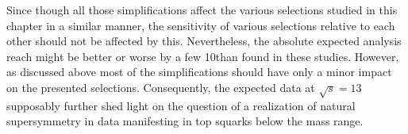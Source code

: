 Since though all those simplifications affect the various selections studied in this chapter in a similar manner, the sensitivity of various selections relative to each other should not be affected by this. Nevertheless, the absolute expected analysis reach might be better or worse by a few 10\gev than found in these studies. However, as discussed above most of the simplifications should have only a minor impact on the presented selections. Consequently, the expected data at $\sqrt{s} = 13$\tev supposably further shed light on the question of a realization of natural supersymmetry in data manifesting in top squarks below the \tev mass range. 